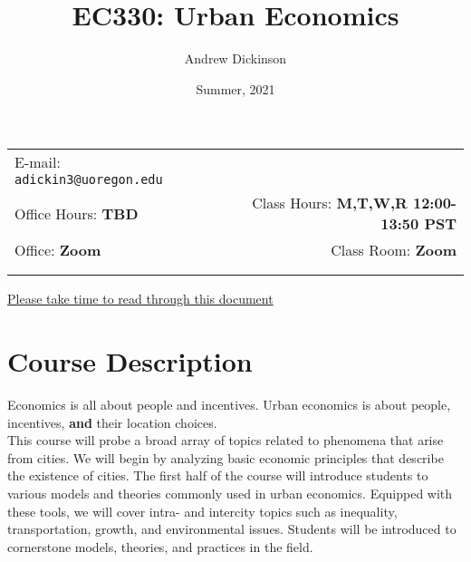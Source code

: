 \documentclass[11pt]{article}
\title{EC330: Urban Economics}
\author{Andrew Dickinson}
\date{Summer, 2021}
\newcommand{\blankline}{\quad\pagebreak[2]}
\begin{document}
	
	\maketitle
	
	\blankline
	
	\begin{tabular*}{.93\textwidth}{@{\extracolsep{\fill}}lr}
		
		
		E-mail: \texttt{adickin3@uoregon.edu}  \\
		
		Office Hours: \textbf{TBD}  &  Class Hours:  \textbf{M,T,W,R 12:00-13:50 PST} \\
		
		Office: \textbf{Zoom} & Class Room: \textbf{Zoom}\\

		&\\
		\hline
		\\
	\end{tabular*}
	
	\href{https://www.youtube.com/watch?v=aOIvB2YtAhY}{Please take time to read through this document}
	
	\vspace{5 mm}
	
	
	\section*{Course Description}
		
	Economics is all about people and incentives. Urban economics is about people, incentives, \textbf{and} their location choices. \\
	
	\noindent This course will probe a broad array of topics related to phenomena that arise from cities. We will begin by analyzing basic economic principles that describe the existence of cities. The first half of the course will introduce students to various models and theories commonly used in urban economics. Equipped with these tools,  we will cover intra- and intercity topics such as inequality, transportation, growth, and environmental issues. Students will be introduced to cornerstone models, theories, and practices in the field.
	
	
\end{document}
